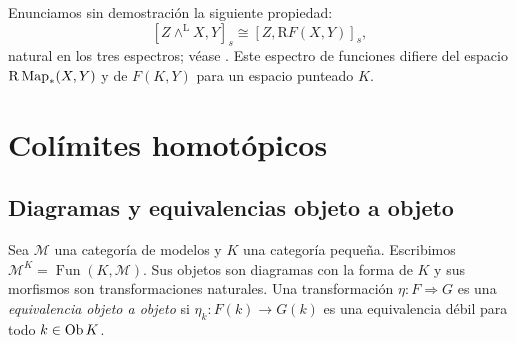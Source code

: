 Enunciamos sin demostración la siguiente propiedad:
\[
[Z\wedge^{\mathrm L}X,Y]_s\cong[Z,\mathrm RF(X,Y)]_s,
\]
natural en los tres espectros; véase \cite[Ejemplo~4.1.4.13]{malkiewich}. Este espectro de funciones difiere del espacio $\mathrm R\operatorname{Map}_*(X,Y)$ y de $F(K,Y)$ para un espacio punteado $K$.

\section{Colímites homotópicos}

\subsection{Diagramas y equivalencias objeto a objeto}

Sea $\mathcal M$ una categoría de modelos y $K$ una categoría pequeña. Escribimos $\mathcal M^K=\operatorname{Fun}(K,\mathcal M)$. Sus objetos son diagramas con la forma de $K$ y sus morfismos son transformaciones naturales. Una transformación $\eta\colon F\Rightarrow G$ es una \emph{equivalencia objeto a objeto} si $\eta_k\colon F(k)\to G(k)$ es una equivalencia débil para todo $k\in\operatorname{Ob} K$.

